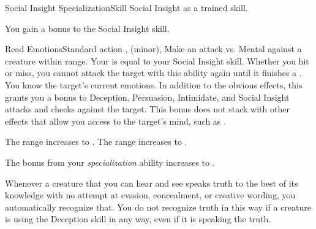   \begin{feat}{Social Insight Specialization}{Skill}
    \featpre Social Insight as a trained skill.

     You gain a  bonus to the Social Insight skill.

    \begin{sustainability}{Read Emotions}{Standard action}
      \abilitytags {},  (minor), 
      \rankline
      Make an attack vs. Mental against a creature within \rngshort range.
      Your  is equal to your Social Insight skill.
      Whether you hit or miss, you cannot attack the target with this ability again until it finishes a .
      \hit You know the target's current emotions.
      In addition to the obvious effects, this grants you a  bonus to Deception, Persuasion, Intimidate, and Social Insight attacks and checks against the target.
      This bonus does not stack with other effects that allow you access to the target's mind, such as .

      \rankline
       The range increases to \medrange.
       The range increases to \longrange.
    \end{sustainability}

     The bonus from your \textit{specialization} ability increases to .

     Whenever a creature that you can hear and see speaks truth to the best of its knowledge with no attempt at evasion, concealment, or creative wording, you automatically recognize that.
    You do not recognize truth in this way if a creature is using the Deception skill in any way, even if it is speaking the truth.
  \end{feat}

